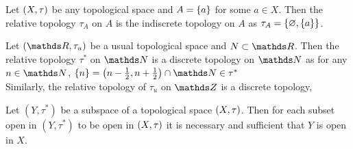 \documentclass[../main-sheet.tex]{subfiles}
\begin{document}
\begin{ex}
    Let  \((X, \tau)\) be any topological space and  \(A=\left\{a\right\}\) for some  \(a \in X\). Then the relative topology  \(\tau_A\) on  \(A\) is the indiscrete topology on  \(A\) as  \(\tau_A = \left\{\varnothing, \left\{a\right\}\right\}\).
\end{ex}
\begin{ex}
    Let  \((\R, \tau_u)\) be a usual topological space and  \(N\subset \R\). Then the relative topology  \(\tau^{*}\) on  \(\N\) is a discrete topology on  \(\N\) as for any  \(n\in\N\),  \(\set{n} = \left(n-\frac{1}{2},n+\frac{1}{2}\right)\cap \N \in \tau^{*}\) \\
    Similarly, the relative topology of  \(\tau_u\) on  \(\Z\) is a discrete topology,
\end{ex}
\begin{rem}
    Let  \((Y,\tau^{*})\) be a subspace of a topological space  \((X, \tau)\). Then for each subset open in  \((Y,\tau^{*})\) to be open in  \((X, \tau)\) it is necessary and sufficient that  \(Y\) is open in  \(X\).
\end{rem}
\end{document}
